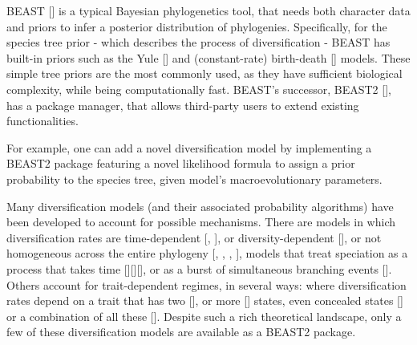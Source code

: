 BEAST [\cite{drummond2007beast}] is a typical Bayesian phylogenetics tool, 
that needs both character data and priors to infer 
a posterior distribution of phylogenies.
Specifically, for the species tree prior - which describes 
the process of diversification - 
BEAST has built-in priors such as the Yule [\cite{yule}] and 
(constant-rate) birth-death [\cite{nee1994reconstructed}] models.
These simple tree priors are the most commonly used, as they have sufficient biological complexity, while being computationally fast.
BEAST's successor, BEAST2 [\cite{bouckaert2019beast}],
has a package manager, that allows third-party users 
to extend existing functionalities.

For example, one can add a novel diversification model by implementing a BEAST2 package featuring a novel likelihood formula to assign a prior probability to the species tree, given model's macroevolutionary parameters.

Many diversification models (and their associated probability algorithms) have been developed to account for possible mechanisms.
There are models in which diversification rates are time-dependent [\cite{nee1994reconstructed}, \cite{rabosky2008explosive}], 
or diversity-dependent [\cite{etienne2011diversity}],
or not homogeneous across the entire phylogeny [\cite{etienne2012conceptual}, 
\cite{rabosky2014automatic}, \cite{alfaro2009nine}, 
\cite{laudanno2020sls}], models that treat speciation as a process that takes time [\cite{rosindell2010protracted}][\cite{etienne2012prolonging}][\cite{lambert2015reconstructed}], 
or as a burst of simultaneous branching
events [\cite{laudanno2018mbd}].
Others account for trait-dependent regimes, in several ways: where diversification rates
depend on a trait that has two [\cite{maddison2007estimating}], 
or more [\cite{fitzjohn2012diversitree}] states,
even concealed states [\cite{beaulieu2016detecting}] 
or a combination of all these [\cite{herrera2018detecting}].
Despite such a rich theoretical landscape, only a few of these diversification models are available as a BEAST2 package.

